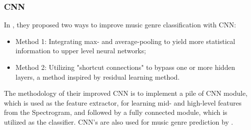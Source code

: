 \subsubsection{CNN}

In \citet{Zhang2016}, they proposed two ways to improve music genre classification with CNN:

\begin{itemize}
    \item Method 1: Integrating max- and average-pooling to yield more statistical information to upper level neural networks;
    \item Method 2: Utilizing "shortcut connections" to bypass one or more hidden layers, a method inspired by residual learning method.
\end{itemize}

The methodology of their improved CNN is to implement a pile of CNN module, which is used as the feature extractor, for learning mid- and high-level features from the Spectrogram, and followed by a fully connected module, which is utilized as the classifier. CNN's are also used for music genre prediction by \citet{Bahuleyan2018}.
